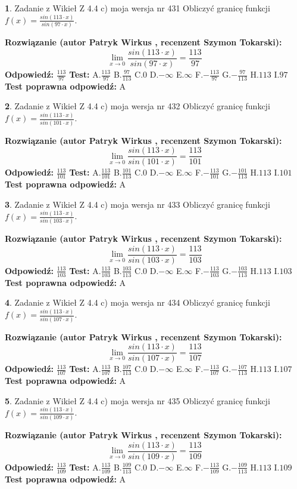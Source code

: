 \documentclass[12pt, a4paper]{article}
\theoremstyle{definition} %
\newtheorem{zad}{}
\newcommand{\zadStart}[1]{\begin{zad}#1\newline}
\newcommand{\zadStop}{\end{zad}}
\newcommand{\rozwStart}[2]{\noindent \textbf{Rozwiązanie (autor #1 , recenzent #2): }\newline}
\newcommand{\rozwStop}{\newline}
\newcommand{\odpStart}{\noindent \textbf{Odpowiedź:}\newline}
\newcommand{\odpStop}{\newline}
\newcommand{\testStart}{\noindent \textbf{Test:}\newline}
\newcommand{\testStop}{\newline}
\newcommand{\kluczStart}{\noindent \textbf{Test poprawna odpowiedź:}\newline}
\newcommand{\kluczStop}{\newline}
\begin{document}
\zadStart{Zadanie z Wikieł Z 4.4 c) moja wersja nr 431}
Obliczyć granicę funkcji $f(x)=\frac{sin(113\cdot x)}{sin(97\cdot x)}$.
\zadStop
\rozwStart{Patryk Wirkus}{Szymon Tokarski}
$$\lim\limits_{x\to 0}\frac{sin(113\cdot x)}{sin(97\cdot x)}=
\frac{113}{97}$$
\rozwStop
\odpStart
$\frac{113}{97}$
\odpStop
\testStart
A.$\frac{113}{97}$
B.$\frac{97}{113}$
C.$0$
D.$-\infty$
E.$\infty$
F.$-\frac{113}{97}$
G.$-\frac{97}{113}$
H.$113$
I.$97$
\testStop
\kluczStart
A
\kluczStop



\zadStart{Zadanie z Wikieł Z 4.4 c) moja wersja nr 432}
Obliczyć granicę funkcji $f(x)=\frac{sin(113\cdot x)}{sin(101\cdot x)}$.
\zadStop
\rozwStart{Patryk Wirkus}{Szymon Tokarski}
$$\lim\limits_{x\to 0}\frac{sin(113\cdot x)}{sin(101\cdot x)}=
\frac{113}{101}$$
\rozwStop
\odpStart
$\frac{113}{101}$
\odpStop
\testStart
A.$\frac{113}{101}$
B.$\frac{101}{113}$
C.$0$
D.$-\infty$
E.$\infty$
F.$-\frac{113}{101}$
G.$-\frac{101}{113}$
H.$113$
I.$101$
\testStop
\kluczStart
A
\kluczStop



\zadStart{Zadanie z Wikieł Z 4.4 c) moja wersja nr 433}
Obliczyć granicę funkcji $f(x)=\frac{sin(113\cdot x)}{sin(103\cdot x)}$.
\zadStop
\rozwStart{Patryk Wirkus}{Szymon Tokarski}
$$\lim\limits_{x\to 0}\frac{sin(113\cdot x)}{sin(103\cdot x)}=
\frac{113}{103}$$
\rozwStop
\odpStart
$\frac{113}{103}$
\odpStop
\testStart
A.$\frac{113}{103}$
B.$\frac{103}{113}$
C.$0$
D.$-\infty$
E.$\infty$
F.$-\frac{113}{103}$
G.$-\frac{103}{113}$
H.$113$
I.$103$
\testStop
\kluczStart
A
\kluczStop



\zadStart{Zadanie z Wikieł Z 4.4 c) moja wersja nr 434}
Obliczyć granicę funkcji $f(x)=\frac{sin(113\cdot x)}{sin(107\cdot x)}$.
\zadStop
\rozwStart{Patryk Wirkus}{Szymon Tokarski}
$$\lim\limits_{x\to 0}\frac{sin(113\cdot x)}{sin(107\cdot x)}=
\frac{113}{107}$$
\rozwStop
\odpStart
$\frac{113}{107}$
\odpStop
\testStart
A.$\frac{113}{107}$
B.$\frac{107}{113}$
C.$0$
D.$-\infty$
E.$\infty$
F.$-\frac{113}{107}$
G.$-\frac{107}{113}$
H.$113$
I.$107$
\testStop
\kluczStart
A
\kluczStop



\zadStart{Zadanie z Wikieł Z 4.4 c) moja wersja nr 435}
Obliczyć granicę funkcji $f(x)=\frac{sin(113\cdot x)}{sin(109\cdot x)}$.
\zadStop
\rozwStart{Patryk Wirkus}{Szymon Tokarski}
$$\lim\limits_{x\to 0}\frac{sin(113\cdot x)}{sin(109\cdot x)}=
\frac{113}{109}$$
\rozwStop
\odpStart
$\frac{113}{109}$
\odpStop
\testStart
A.$\frac{113}{109}$
B.$\frac{109}{113}$
C.$0$
D.$-\infty$
E.$\infty$
F.$-\frac{113}{109}$
G.$-\frac{109}{113}$
H.$113$
I.$109$
\testStop
\kluczStart
A
\kluczStop
\end{document}
